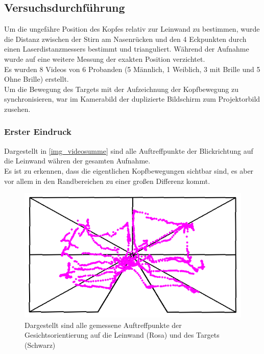 \subsection{Versuchsdurchführung}
Um die ungefähre Position des Kopfes relativ zur Leinwand zu bestimmen, wurde die Distanz zwischen der Stirn am Nasenrücken und den 4 Eckpunkten durch einen Laserdistanzmessers bestimmt und trianguliert. Während der Aufnahme wurde auf eine weitere Messung der exakten Position verzichtet.\\
Es wurden 8 Videos von 6 Probanden (5 Männlich, 1 Weiblich, 3 mit Brille und 5 Ohne Brille) erstellt.\\
Um die Bewegung des Targets mit der Aufzeichnung der Kopfbewegung zu synchronisieren, war im Kamerabild der duplizierte Bildschirm zum Projektorbild zusehen.
\subsubsection{Erster Eindruck}
Dargestellt in \autoref{img_videosumme} sind alle Auftreffpunkte der Blickrichtung auf die Leinwand währen der gesamten Aufnahme.\\
Es ist zu erkennen, dass die eigentlichen Kopfbewegungen sichtbar sind, es aber vor allem in den Randbereichen zu einer großen Differenz kommt.\\
\begin{figure}
	\centering
	\includegraphics[width=0.7\linewidth]{OpenFace_Img/VideoSumme}
	\caption{Dargestellt sind alle gemessene Auftreffpunkte der Gesichtsorientierung auf die Leinwand (Rosa) und des Targets (Schwarz)}
	\label{img_videosumme}
\end{figure}
